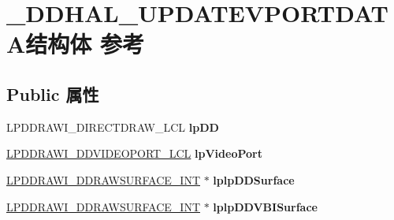 \hypertarget{struct___d_d_h_a_l___u_p_d_a_t_e_v_p_o_r_t_d_a_t_a}{}\section{\+\_\+\+D\+D\+H\+A\+L\+\_\+\+U\+P\+D\+A\+T\+E\+V\+P\+O\+R\+T\+D\+A\+T\+A结构体 参考}
\label{struct___d_d_h_a_l___u_p_d_a_t_e_v_p_o_r_t_d_a_t_a}
\subsection*{Public 属性}
\begin{DoxyCompactItemize}
\item 
\mbox{\label{struct___d_d_h_a_l___u_p_d_a_t_e_v_p_o_r_t_d_a_t_a_a708ececf7919aafe9f4ba9e7c7661f68}} 
L\+P\+D\+D\+R\+A\+W\+I\+\_\+\+D\+I\+R\+E\+C\+T\+D\+R\+A\+W\+\_\+\+L\+CL {\bfseries lp\+DD}
\item 
\mbox{\label{struct___d_d_h_a_l___u_p_d_a_t_e_v_p_o_r_t_d_a_t_a_a750666f3096c1a3ddcb7a7361a8bebdc}} 
\hyperlink{struct___d_d_r_a_w_i___d_d_v_i_d_e_o_p_o_r_t___l_c_l}{L\+P\+D\+D\+R\+A\+W\+I\+\_\+\+D\+D\+V\+I\+D\+E\+O\+P\+O\+R\+T\+\_\+\+L\+CL} {\bfseries lp\+Video\+Port}
\item 
\mbox{\label{struct___d_d_h_a_l___u_p_d_a_t_e_v_p_o_r_t_d_a_t_a_aa5a12eb4b58cff86258954075b218b42}} 
\hyperlink{struct___d_d_r_a_w_i___d_d_r_a_w_s_u_r_f_a_c_e___i_n_t}{L\+P\+D\+D\+R\+A\+W\+I\+\_\+\+D\+D\+R\+A\+W\+S\+U\+R\+F\+A\+C\+E\+\_\+\+I\+NT} $\ast$ {\bfseries lplp\+D\+D\+Surface}
\item 
\mbox{\label{struct___d_d_h_a_l___u_p_d_a_t_e_v_p_o_r_t_d_a_t_a_adf8f28c72abcde1a42894ae3e7b2f09c}} 
\hyperlink{struct___d_d_r_a_w_i___d_d_r_a_w_s_u_r_f_a_c_e___i_n_t}{L\+P\+D\+D\+R\+A\+W\+I\+\_\+\+D\+D\+R\+A\+W\+S\+U\+R\+F\+A\+C\+E\+\_\+\+I\+NT} $\ast$ {\bfseries lplp\+D\+D\+V\+B\+I\+Surface}
\item 
\mbox{\label{struct___d_d_h_a_l___u_p_d_a_t_e_v_p_o_r_t_d_a_t_a_a5ea89ca5e5754c21be198c02b288e38d}} 

\end{DoxyCompactItemize}
